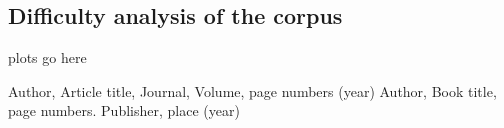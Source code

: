 \subsection{Difficulty analysis of the corpus} plots go here


\begin{thebibliography}{}
%
%
Author, Article title, Journal, Volume, page numbers (year)
Author, Book title, page numbers. Publisher, place (year)
\end{thebibliography}




